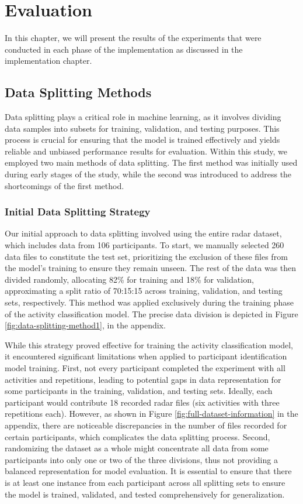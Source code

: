 \documentclass{l4proj}
\begin{document}
\chapter{Evaluation} 
In this chapter, we will present the results of the experiments that were conducted in each phase of the implementation as discussed in the implementation chapter.

\section{Data Splitting Methods}
Data splitting plays a critical role in machine learning, as it involves dividing data samples into subsets for training, validation, and testing purposes. This process is crucial for ensuring that the model is trained effectively and yields reliable and unbiased performance results for evaluation. Within this study, we employed two main methods of data splitting. The first method was initially used during early stages of the study, while the second was introduced to address the shortcomings of the first method.

\subsection{Initial Data Splitting Strategy}
Our initial approach to data splitting involved using the entire radar dataset, which includes data from 106 participants. To start, we manually selected 260 data files to constitute the test set, prioritizing the exclusion of these files from the model's training to ensure they remain unseen. The rest of the data was then divided randomly, allocating 82\% for training and 18\% for validation, approximating a split ratio of 70:15:15 across training, validation, and testing sets, respectively.  This method was applied exclusively during the training phase of the activity classification model. The precise data division is depicted in Figure \ref{fig:data-splitting-method1}, in the appendix.

While this strategy proved effective for training the activity classification model, it encountered significant limitations when applied to participant identification model training. First, not every participant completed the experiment with all activities and repetitions, leading to potential gaps in data representation for some participants in the training, validation, and testing sets. Ideally, each participant would contribute 18 recorded radar files (six activities with three repetitions each). However, as shown in Figure \ref{fig:full-dataset-information} in the appendix, there are noticeable discrepancies in the number of files recorded for certain participants, which complicates the data splitting process. Second, randomizing the dataset as a whole might concentrate all data from some participants into only one or two of the three divisions, thus not providing a balanced representation for model evaluation. It is essential to ensure that there is at least one instance from each participant across all splitting sets to ensure the model is trained, validated, and tested comprehensively for generalization.
\end{document}
